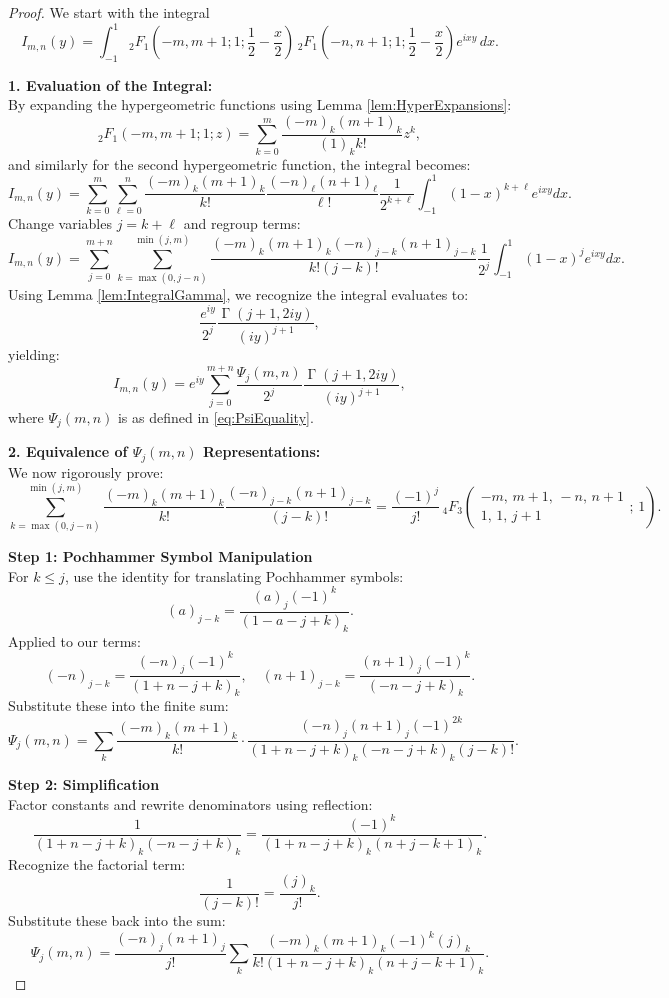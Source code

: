 \documentclass[12pt]{article}
\DeclareMathOperator{\gamma}{\Gamma}
\begin{document}
\begin{proof}
We start with the integral
\[
I_{m,n}(y) = \int_{-1}^1 {}_2F_1\left(-m, m+1; 1; \frac{1}{2}-\frac{x}{2}\right)
\, {}_2F_1\left(-n, n+1; 1; \frac{1}{2}-\frac{x}{2}\right) e^{i x y}\, dx.
\]

\textbf{1. Evaluation of the Integral:}\\[1mm]
By expanding the hypergeometric functions using Lemma \ref{lem:HyperExpansions}:
\[
{}_2F_1(-m, m+1; 1; z) = \sum_{k=0}^m \frac{(-m)_k (m+1)_k}{(1)_k k!} z^k,
\]
and similarly for the second hypergeometric function, the integral becomes:
\[
I_{m,n}(y) = \sum_{k=0}^m \sum_{\ell=0}^n \frac{(-m)_k (m+1)_k}{k!} \frac{(-n)_\ell (n+1)_\ell}{\ell!} \frac{1}{2^{k+\ell}} \int_{-1}^1 (1-x)^{k+\ell} e^{i x y} dx.
\]
Change variables $j = k + \ell$ and regroup terms:
\[
I_{m,n}(y) = \sum_{j=0}^{m+n} \sum_{k=\max(0,j-n)}^{\min(j,m)} \frac{(-m)_k (m+1)_k (-n)_{j-k} (n+1)_{j-k}}{k! (j-k)!} \frac{1}{2^j} \int_{-1}^1 (1-x)^j e^{i x y} dx.
\]
Using Lemma \ref{lem:IntegralGamma}, we recognize the integral evaluates to:
\[
\frac{e^{iy}}{2^j} \frac{\gamma(j+1, 2iy)}{(iy)^{j+1}},
\]
yielding:
\[
I_{m,n}(y) = e^{iy} \sum_{j=0}^{m+n} \frac{\Psi_j(m,n)}{2^j} \frac{\gamma(j+1,2iy)}{(iy)^{j+1}},
\]
where $\Psi_j(m,n)$ is as defined in \eqref{eq:PsiEquality}.

\textbf{2. Equivalence of $\Psi_j(m,n)$ Representations:}\\[1mm]
We now rigorously prove:
\[
\sum_{k=\max(0,j-n)}^{\min(j,m)} \frac{(-m)_k (m+1)_k}{k!} \frac{(-n)_{j-k} (n+1)_{j-k}}{(j-k)!} = \frac{(-1)^j}{j!} {\,}_4F_3\left(
\begin{matrix}
-m,\, m+1,\, -n,\, n+1 \\
1,\, 1,\, j+1
\end{matrix};\, 1\right).
\]

\textbf{Step 1: Pochhammer Symbol Manipulation}\\[1mm]
For $k \leq j$, use the identity for translating Pochhammer symbols:
\[
(a)_{j-k} = \frac{(a)_j (-1)^k}{(1 - a - j + k)_k}.
\]
Applied to our terms:
\[
(-n)_{j-k} = \frac{(-n)_j (-1)^k}{(1 + n - j + k)_k}, \quad
(n+1)_{j-k} = \frac{(n+1)_j (-1)^k}{(-n - j + k)_k}.
\]
Substitute these into the finite sum:
\[
\Psi_j(m,n) = \sum_{k} \frac{(-m)_k (m+1)_k}{k!} \cdot \frac{(-n)_j (n+1)_j (-1)^{2k}}{(1 + n - j + k)_k (-n - j + k)_k (j-k)!}.
\]

\textbf{Step 2: Simplification}\\[1mm]
Factor constants and rewrite denominators using reflection:
\[
\frac{1}{(1 + n - j + k)_k (-n - j + k)_k} = \frac{(-1)^k}{(1 + n - j + k)_k (n + j - k + 1)_k}.
\]
Recognize the factorial term:
\[
\frac{1}{(j - k)!} = \frac{(j)_k}{j!}.
\]
Substitute these back into the sum:
\[
\Psi_j(m,n) = \frac{(-n)_j (n+1)_j}{j!} \sum_{k} \frac{(-m)_k (m+1)_k (-1)^k (j)_k}{k! (1 + n - j + k)_k (n + j - k + 1)_k}.
\]


\end{proof}
\end{document}
